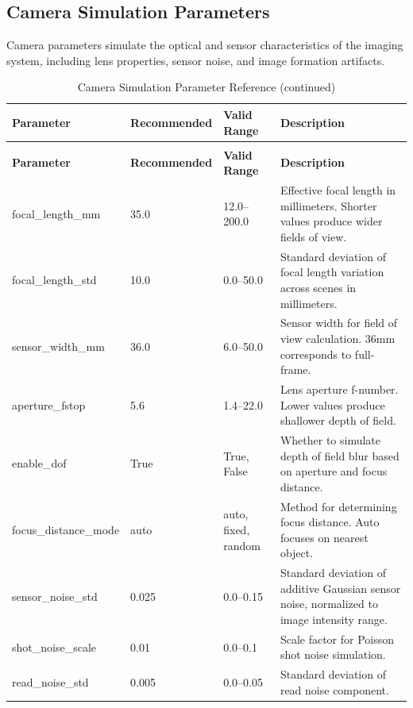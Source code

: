\subsection{Camera Simulation Parameters}

Camera parameters simulate the optical and sensor characteristics of the imaging system, including lens properties, sensor noise, and image formation artifacts.

\begin{longtable}{p{3.5cm}p{2cm}p{2.5cm}p{5.5cm}}
\caption{Camera Simulation Parameter Reference} \label{tab:camera} \\
\toprule
\textbf{Parameter} & \textbf{Recommended} & \textbf{Valid Range} & \textbf{Description} \\
\midrule
\endfirsthead
\caption[]{Camera Simulation Parameter Reference (continued)} \\
\toprule
\textbf{Parameter} & \textbf{Recommended} & \textbf{Valid Range} & \textbf{Description} \\
\midrule
\endhead
\bottomrule
\endfoot
\bottomrule
\endlastfoot
focal\_length\_mm & 35.0 & 12.0--200.0 & Effective focal length in millimeters. Shorter values produce wider fields of view. \\
\addlinespace
focal\_length\_std & 10.0 & 0.0--50.0 & Standard deviation of focal length variation across scenes in millimeters. \\
\addlinespace
sensor\_width\_mm & 36.0 & 6.0--50.0 & Sensor width for field of view calculation. 36mm corresponds to full-frame. \\
\addlinespace
aperture\_fstop & 5.6 & 1.4--22.0 & Lens aperture f-number. Lower values produce shallower depth of field. \\
\addlinespace
enable\_dof & True & True, False & Whether to simulate depth of field blur based on aperture and focus distance. \\
\addlinespace
focus\_distance\_mode & auto & auto, fixed, random & Method for determining focus distance. Auto focuses on nearest object. \\
\addlinespace
sensor\_noise\_std & 0.025 & 0.0--0.15 & Standard deviation of additive Gaussian sensor noise, normalized to image intensity range. \\
\addlinespace
shot\_noise\_scale & 0.01 & 0.0--0.1 & Scale factor for Poisson shot noise simulation. \\
\addlinespace
read\_noise\_std & 0.005 & 0.0--0.05 & Standard deviation of read noise component. \\

\end{longtable}
